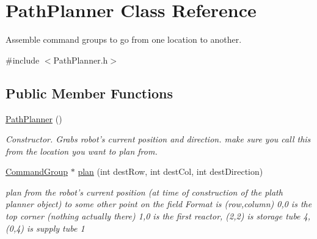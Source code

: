 \hypertarget{classPathPlanner}{\section{Path\-Planner Class Reference}
\label{classPathPlanner}
}


Assemble command groups to go from one location to another.  




{\ttfamily \#include $<$Path\-Planner.\-h$>$}

\subsection*{Public Member Functions}
\begin{DoxyCompactItemize}
\item 
\hyperlink{classPathPlanner_a376f30d795cfe0a40f8923f49336f7da}{Path\-Planner} ()
\begin{DoxyCompactList}\small\item\em Constructor. Grabs robot's current position and direction. make sure you call this from the location you want to plan from. \end{DoxyCompactList}\item 
\hyperlink{classCommandGroup}{Command\-Group} $\ast$ \hyperlink{classPathPlanner_acfae981cdde0b63b700bb1e2e9ffc1a6}{plan} (int dest\-Row, int dest\-Col, int dest\-Direction)
\begin{DoxyCompactList}\small\item\em plan from the robot's current position (at time of construction of the plath planner object) to some other point on the field Format is (row,column) 0,0 is the top corner (nothing actually there) 1,0 is the first reactor, (2,2) is storage tube 4, (0,4) is supply tube 1 \end{DoxyCompactList}\end{DoxyCompactItemize}
